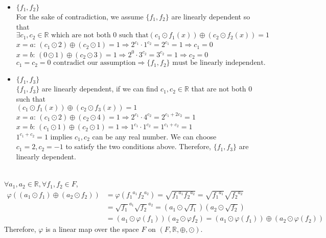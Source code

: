 \documentclass[a4paper,10.5pt]{article}
\newcommand{\R}{\mathbb{R}}
\begin{document}

\begin{itemize}
	\item $\{f_1,f_2\}$ \\
	For the sake of contradiction, we assume $\{f_1,f_2\}$ are linearly dependent so that \\
	$\exists c_1 ,c_2 \in \R \text{ which are not both 0 such that} \left( c_1 \odot f_1(x) \right) \oplus \left( c_2 \odot f_2(x) \right) = 1$ \\
	$x = a$: $\left( c_1 \odot 2 \right) \oplus \left( c_2 \odot 1 \right) = 1 \Rightarrow 2^{c_1} \cdot 1^{c_2} = 2^{c_1} = 1 \Rightarrow c_1 = 0$ \\
	$x = b$: $\left( 0 \odot 1 \right) \oplus \left( c_2 \odot 3 \right) = 1 \Rightarrow 2^{0} \cdot 3^{c_2} = 3^{c_2} = 1 \Rightarrow c_2 = 0$ \\
	$c_1 = c_2 = 0 \text{ contradict our assumption} \Rightarrow \{f_1, f_2\} \text{ must be linearly independent.}$ 	
	\item $\{f_1,f_3\}$ \\
	$\{f_1,f_3\}$ are linearly dependent, if we can find $c_1 ,c_2 \in \R$ that are not both $0$ such that \\
	$\left( c_1 \odot f_1(x) \right) \oplus \left( c_2 \odot f_3(x) \right) = 1$ \\
	$x = a$: $\left( c_1 \odot 2 \right) \oplus \left( c_2 \odot 4 \right) = 1 \Rightarrow 2^{c_1} \cdot 4^{c_2} = 2^{c_1 + 2 c_2} = 1$ \\
	$x = b$: $\left( c_1 \odot 1 \right) \oplus \left( c_2 \odot 1 \right) = 1 \Rightarrow 1^{c_1} \cdot 1^{c_2} = 1^{c_1 + c_2} = 1$ \\
	$1^{c_1 + c_2} = 1$ implies $c_1, c_2$ can be any real number. We can choose $c_1 = 2, c_2 = -1$ to satisfy the two conditions above. Therefore, $\{f_1,f_3\}$ are linearly dependent.
\end{itemize}

 \\

$\forall a_1, a_2 \in \R, \forall f_1, f_2 \in F$, 
\begin{align*}
\varphi\left((a_1 \odot f_1) \oplus (a_2 \odot f_2) \right) 
&= \varphi({f_1}^{a_1}{f_2}^{a_2}) = \sqrt{{f_1}^{a_1}{f_2}^{a_2}} = \sqrt{{f_1}^{a_1}}\sqrt{{f_2}^{a_2}} \\ 
&= {\sqrt{f_1}}^{a_1}{\sqrt{f_2}}^{a_2} = \left(a_1 \odot \sqrt{f_1}\right)\left(a_2 \odot \sqrt{f_2}\right) \\
&= \left(a_1 \odot \varphi(f_1)\right)\left(a_2 \odot \varphi{f_2} \right)= \left(a_1 \odot \varphi(f_1)\right) \oplus \left(a_2 \odot \varphi(f_2)\right)
\end{align*}
Therefore, $\varphi$ is a linear map over the space $F$ on $(F, \mathbb{R}, \oplus, \odot)$.
\end{document}
